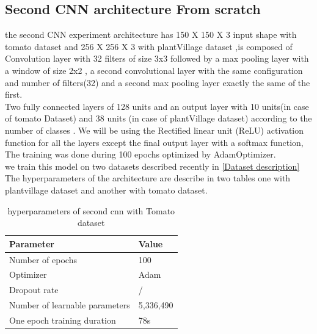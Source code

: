 \subsection{Second CNN architecture From scratch}
the second CNN experiment architecture has 150 X 150 X 3 input shape with tomato dataset and 256 X 256 X 3 with plantVillage dataset ,is composed of Convolution layer with 32 filters of size 3x3 followed by a max pooling layer with a window of size 2x2 , a second convolutional layer with the same configuration and number of filters(32) and a second max pooling layer exactly the same of the first. \\
Two fully connected layers of 128 units and an output layer with 10 units(in case of tomato Dataset) and 38 units (in case of plantVillage dataset) according to the number of classes .
We will be using the Rectified linear unit (ReLU) activation
function for all the layers except the final output layer with a softmax function,
The training was done
during 100 epochs optimized by AdamOptimizer.\\
we train this model on two datasets described recently in \ref{Dataset description}
The hyperparameters of the architecture are
describe in two tables one with plantvillage dataset and another with tomato dataset.\\

\begin{table}[H]
\begin{tabular}{@{}|p{9cm}|p{3cm}|@{}}
\hline
 \centering \textbf{Parameter} & \textbf{Value}  \\ \hline
 Number of epochs & 100  \\  \hline
 Optimizer & Adam \\ \hline
 Dropout rate & / \\ \hline
 Number of learnable parameters & 5,336,490 \\ \hline
 One epoch training duration & 78s \\ \hline
 
\end{tabular}
\caption{hyperparameters of second cnn with Tomato dataset}
\end{table}

